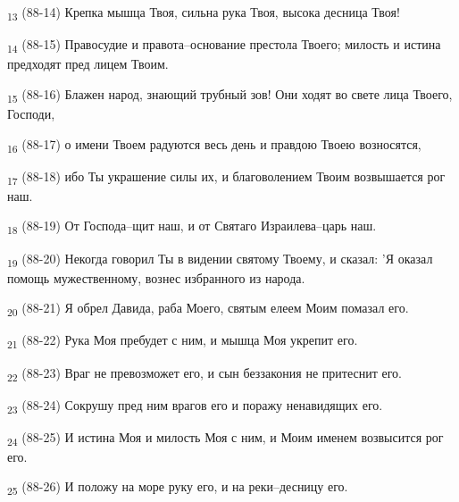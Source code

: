 \begin{tcolorbox}
\textsubscript{13} (88-14) Крепка мышца Твоя, сильна рука Твоя, высока десница Твоя!
\end{tcolorbox}
\begin{tcolorbox}
\textsubscript{14} (88-15) Правосудие и правота--основание престола Твоего; милость и истина предходят пред лицем Твоим.
\end{tcolorbox}
\begin{tcolorbox}
\textsubscript{15} (88-16) Блажен народ, знающий трубный зов! Они ходят во свете лица Твоего, Господи,
\end{tcolorbox}
\begin{tcolorbox}
\textsubscript{16} (88-17) о имени Твоем радуются весь день и правдою Твоею возносятся,
\end{tcolorbox}
\begin{tcolorbox}
\textsubscript{17} (88-18) ибо Ты украшение силы их, и благоволением Твоим возвышается рог наш.
\end{tcolorbox}
\begin{tcolorbox}
\textsubscript{18} (88-19) От Господа--щит наш, и от Святаго Израилева--царь наш.
\end{tcolorbox}
\begin{tcolorbox}
\textsubscript{19} (88-20) Некогда говорил Ты в видении святому Твоему, и сказал: 'Я оказал помощь мужественному, вознес избранного из народа.
\end{tcolorbox}
\begin{tcolorbox}
\textsubscript{20} (88-21) Я обрел Давида, раба Моего, святым елеем Моим помазал его.
\end{tcolorbox}
\begin{tcolorbox}
\textsubscript{21} (88-22) Рука Моя пребудет с ним, и мышца Моя укрепит его.
\end{tcolorbox}
\begin{tcolorbox}
\textsubscript{22} (88-23) Враг не превозможет его, и сын беззакония не притеснит его.
\end{tcolorbox}
\begin{tcolorbox}
\textsubscript{23} (88-24) Сокрушу пред ним врагов его и поражу ненавидящих его.
\end{tcolorbox}
\begin{tcolorbox}
\textsubscript{24} (88-25) И истина Моя и милость Моя с ним, и Моим именем возвысится рог его.
\end{tcolorbox}
\begin{tcolorbox}
\textsubscript{25} (88-26) И положу на море руку его, и на реки--десницу его.
\end{tcolorbox}
